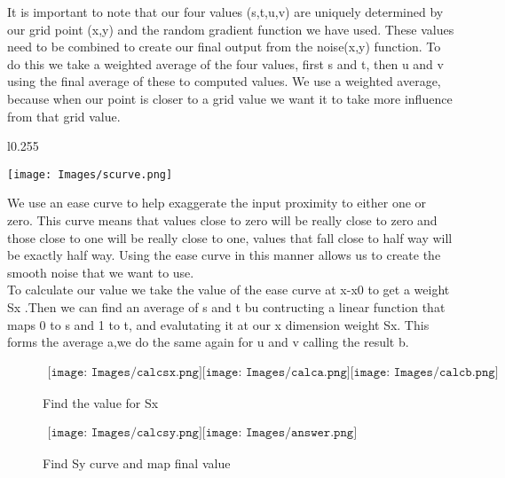 It is important to note that our four values (s,t,u,v) are uniquely determined by
our grid point (x,y) and the random gradient function we have used. These values need
to be combined to create our final output from the noise(x,y) function. To do this
we take a weighted average of the four values, first s and t, then u and v using the
final average of these to computed values. We use a weighted average, because when
our point is closer to a grid value we want it to take more influence from that grid
value.\\

\begin{wrapfigure}{l}{0.255\textwidth}
	\vspace{-40pt}
	\hspace{-20pt}
	\begin{center}
		\texttt{[image: Images/scurve.png]}
	\end{center}
\end{wrapfigure}

We use an ease curve to help exaggerate the input proximity to either one or zero.
This curve means that values close to zero will be really close to zero and those
close to one will be really close to one, values that fall close to half way will be
exactly half way. Using the ease curve in this manner allows us to create the smooth
noise that we want to use.\\

To calculate our value we take the value of the ease curve at x-x0 to get a weight Sx
.Then we can find an average of s and t bu contructing a linear function that maps 0
to s and 1 to t, and evalutating it at our x dimension weight Sx. This forms the 
average a,we do the same again for u and v calling the result b.\\

\begin{figure}[h!]
\begin{center}$
\begin{array}{cc}
\texttt{[image: Images/calcsx.png]}
\texttt{[image: Images/calca.png]}
\texttt{[image: Images/calcb.png]}
\end{array}$
\end{center}
\caption{Find the value for Sx}
\end{figure}


\begin{figure}[h!]
\begin{center}$
\begin{array}{cc}
\texttt{[image: Images/calcsy.png]}
\texttt{[image: Images/answer.png]}
\end{array}$
\end{center}
\caption{Find Sy curve and map final value}
\end{figure}

